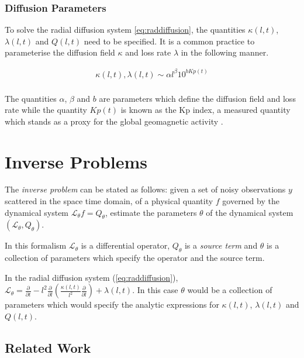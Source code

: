 \subsubsection*{Diffusion Parameters}

To solve the radial diffusion system \ref{eq:raddiffusion}, the
quantities $\kappa(l, t)$, $\lambda(l, t)$ and $Q(l, t)$ need to be
specified. It is a common practice \citetext{see \citealp{GRL:GRL10762},
\citealp{JGRA:JGRA15067}, \citealp{JGRA:JGRA18021} and
\citealp{GRL:GRL22815}} to parameterise the diffusion field
$\kappa$ and loss rate $\lambda$ in the following manner.

\begin{align}
  \kappa(l,t), \lambda(l, t) \sim \alpha l^{\beta} 10^{b Kp(t)} \\
\end{align}

The quantities $\alpha$, $\beta$ and $b$ are parameters which define
the diffusion field and loss rate while the quantity $Kp(t)$ is known
as the Kp index, a measured quantity which stands as a proxy for the
global geomagnetic activity \citep{BartelsKp}.


\section{Inverse Problems}\label{sec:inv}

The \emph{inverse problem} can be stated as follows: given a set of
noisy observations $y$ scattered in the space time domain, of a
physical quantity $f$ governed by the dynamical system
$\mathcal{L}_{\theta} f = Q_{\theta}$, estimate the parameters $\theta$ of the
dynamical system $(\mathcal{L}_{\theta}, Q_{\theta})$.

In this formalism $\mathcal{L}_{\theta}$ is a differential operator,
$Q_{\theta}$ is a \emph{source term} and $\theta$ is a collection of parameters
which specify the operator and the source term.

In the radial diffusion system (\ref{eq:raddiffusion}), $\mathcal{L}_{\theta} =
\frac{\partial}{\partial{t}} - l^2 \frac{\partial}{\partial{l}}\left( \frac{\kappa(l,
      t)}{l^{2}} \frac{\partial}{\partial{l}} \right) + \lambda(l,
  t)$. In this case $\theta$ would be a collection of parameters which
  would specify the analytic expressions for $\kappa(l,t)$,
  $\lambda(l,t)$ and $Q(l,t)$.

\subsection{Related Work}

